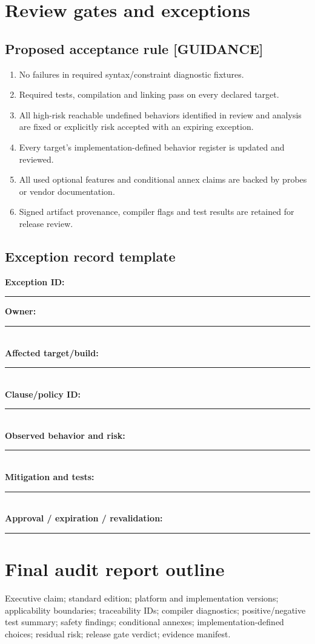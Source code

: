 \documentclass[10pt,letterpaper,oneside]{report}
\begin{document}
\chapter{Review gates and exceptions}
\section{Proposed acceptance rule [GUIDANCE]}
\begin{enumerate}
\item No failures in required syntax/constraint diagnostic fixtures.
\item Required tests, compilation and linking pass on every declared target.
\item All high-risk reachable undefined behaviors identified in review and analysis are fixed or explicitly risk accepted with an expiring exception.
\item Every target's implementation-defined behavior register is updated and reviewed.
\item All used optional features and conditional annex claims are backed by probes or vendor documentation.
\item Signed artifact provenance, compiler flags and test results are retained for release review.
\end{enumerate}
\section{Exception record template}
\begin{keybox}\textbf{Exception ID:} \rule{2.3in}{.2pt}\quad \textbf{Owner:} \rule{1.4in}{.2pt}\\
\textbf{Affected target/build:} \rule{4.8in}{.2pt}\\
\textbf{Clause/policy ID:} \rule{4.8in}{.2pt}\\
\textbf{Observed behavior and risk:} \rule{4.2in}{.2pt}\\
\textbf{Mitigation and tests:} \rule{4.5in}{.2pt}\\
\textbf{Approval / expiration / revalidation:} \rule{3.5in}{.2pt}\end{keybox}
\chapter{Final audit report outline}
Executive claim; standard edition; platform and implementation versions; applicability boundaries; traceability IDs; compiler diagnostics; positive/negative test summary; safety findings; conditional annexes; implementation-defined choices; residual risk; release gate verdict; evidence manifest.
\end{document}
